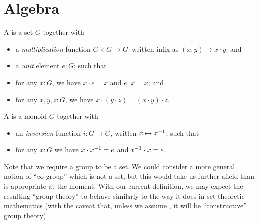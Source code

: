 \documentclass[hott-all.tex]{subfiles}
\begin{document}
\section{Algebra}
% 
% 
% 
% 
\begin{defn}
  A 
  is a set $G$ together with
  \begin{itemize}
  \item a \emph{multiplication}
    function $G\times G\to G$, written infix as $(x,y) \mapsto x\cdot y$; and
  \item a \emph{unit}
    element $e:G$; such that
  \item for any $x:G$, we have $x\cdot e = x$ and $e\cdot x = x$; and
  \item for any $x,y,z:G$, we have $x\cdot (y\cdot z) = (x\cdot y)\cdot z$.
  \end{itemize}
  A 
  is a monoid $G$ together with
  \begin{itemize}
  \item an \emph{inversion} function $i:G\to G$, written $x\mapsto \mathord{{x}^{-1}}$; such that
  \item for any $x:G$ we have $x\cdot \mathord{{x}^{-1}} = e$ and $\mathord{{x}^{-1}} \cdot x = e$.
  \end{itemize}
\end{defn}
% 
\begin{rmk}
Note that we require a group to be a set.
We could consider a more general notion of ``$\infty$-group''%
which is not a set, but this would take us further afield than is appropriate at the moment.
With our current definition, we may expect the resulting ``group theory'' to behave similarly to the way it does in set-theoretic mathematics (with the caveat that, unless we assume \LEM{}, it will be ``constructive'' group theory).
\end{rmk}
\end{document}
